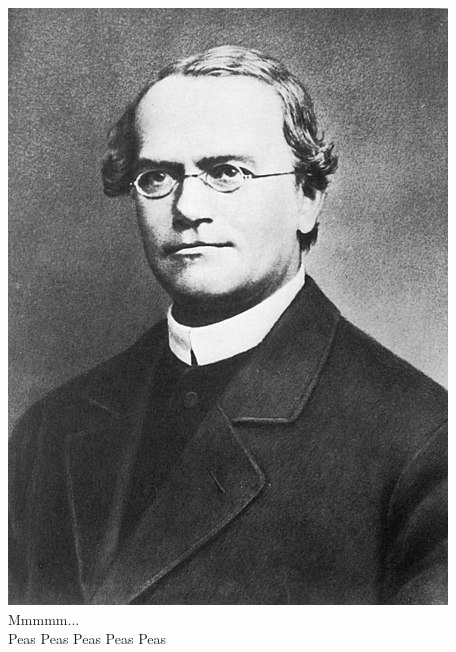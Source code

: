 \documentclass{beamer}
\begin{document}
\begin{frame}
\begin{columns}[T]
\begin{column}{0.6\textwidth}
		\end{column}
		\begin{column}{.4\textwidth}
			\includegraphics[keepaspectratio, width  =\textwidth]{img/mendel}
			\centering
			Mmmmm...\\
			Peas Peas Peas Peas Peas
		\end{column}
		
	

		
	\end{columns}
\end{frame}
\end{document}
